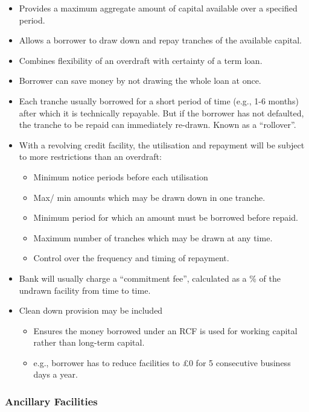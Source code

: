 \documentclass[
]{article}
\providecommand{\tightlist}{%
  \setlength{\itemsep}{0pt}\setlength{\parskip}{0pt}}
\begin{document}
\begin{itemize}
\tightlist
\item
  Provides a maximum aggregate amount of capital available over a
  specified period.
\item
  Allows a borrower to draw down and repay tranches of the available
  capital.
\item
  Combines flexibility of an overdraft with certainty of a term loan.
\item
  Borrower can save money by not drawing the whole loan at once.
\item
  Each tranche usually borrowed for a short period of time (e.g., 1-6
  months) after which it is technically repayable. But if the borrower
  has not defaulted, the tranche to be repaid can immediately re-drawn.
  Known as a ``rollover''.
\item
  With a revolving credit facility, the utilisation and repayment will
  be subject to more restrictions than an overdraft:

  \begin{itemize}
  \tightlist
  \item
    Minimum notice periods before each utilisation
  \item
    Max/ min amounts which may be drawn down in one tranche.
  \item
    Minimum period for which an amount must be borrowed before repaid.
  \item
    Maximum number of tranches which may be drawn at any time.
  \item
    Control over the frequency and timing of repayment.
  \end{itemize}
\item
  Bank will usually charge a ``commitment fee'', calculated as a \% of
  the undrawn facility from time to time.
\item
  Clean down provision may be included

  \begin{itemize}
  \tightlist
  \item
    Ensures the money borrowed under an RCF is used for working capital
    rather than long-term capital.
  \item
    e.g., borrower has to reduce facilities to £0 for 5 consecutive
    business days a year.
  \end{itemize}
\end{itemize}

\hypertarget{ancillary-facilities}{%
\subsubsection{Ancillary Facilities}\label{ancillary-facilities}}
\end{document}
